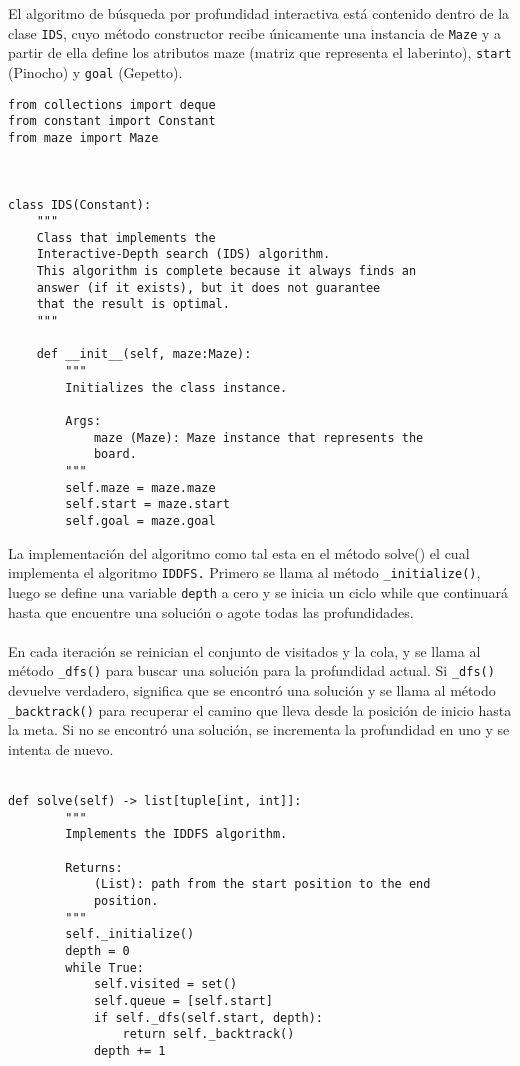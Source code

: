 El algoritmo de búsqueda por profundidad interactiva está contenido dentro de la clase \lstinline{IDS}, cuyo método constructor recibe únicamente una instancia de \lstinline{Maze} y a partir de ella define los atributos maze (matriz que representa el laberinto), \lstinline{start} (Pinocho) y \lstinline{goal} (Gepetto).\\

\begin{lstlisting}
from collections import deque
from constant import Constant
from maze import Maze



class IDS(Constant):
    """
    Class that implements the 
    Interactive-Depth search (IDS) algorithm.
    This algorithm is complete because it always finds an 
    answer (if it exists), but it does not guarantee 
    that the result is optimal.
    """

    def __init__(self, maze:Maze):
        """
        Initializes the class instance.

        Args:
            maze (Maze): Maze instance that represents the 
            board.
        """
        self.maze = maze.maze
        self.start = maze.start
        self.goal = maze.goal
\end{lstlisting}
\clearpage
La implementación del algoritmo como tal esta en el método solve() el cual implementa el algoritmo \lstinline{IDDFS.} Primero se llama al método \lstinline{_initialize()}, luego se define una variable \lstinline{depth} a cero y se inicia un ciclo while que continuará hasta que encuentre una solución o agote todas las profundidades. \\\\ En cada iteración se reinician el conjunto de visitados y la cola, y se llama al método \lstinline{_dfs()}  para buscar una solución para la profundidad actual. Si \lstinline{_dfs()} devuelve verdadero, significa que se encontró una solución y se llama al método \lstinline{_backtrack()} para recuperar el camino que lleva desde la posición de inicio hasta la meta. Si no se encontró una solución, se incrementa la profundidad en uno y se intenta de nuevo.\\\

\begin{lstlisting}
def solve(self) -> list[tuple[int, int]]:
        """
        Implements the IDDFS algorithm.

        Returns:
            (List): path from the start position to the end 
            position.
        """
        self._initialize()
        depth = 0
        while True:
            self.visited = set()
            self.queue = [self.start]
            if self._dfs(self.start, depth):
                return self._backtrack()
            depth += 1
\end{lstlisting}


